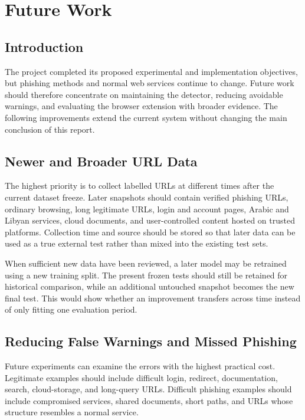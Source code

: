 \chapter{Future Work}
\label{chap:future-work}

\section{Introduction}

The project completed its proposed experimental and implementation objectives,
but phishing methods and normal web services continue to change. Future work
should therefore concentrate on maintaining the detector, reducing avoidable
warnings, and evaluating the browser extension with broader evidence. The
following improvements extend the current system without changing the main
conclusion of this report.

\section{Newer and Broader URL Data}

The highest priority is to collect labelled URLs at different times after the
current dataset freeze. Later snapshots should contain verified phishing URLs,
ordinary browsing, long legitimate URLs, login and account pages, Arabic and
Libyan services, cloud documents, and user-controlled content hosted on trusted
platforms. Collection time and source should be stored so that later data can
be used as a true external test rather than mixed into the existing test sets.

When sufficient new data have been reviewed, a later model may be retrained
using a new training split. The present frozen tests should still be retained
for historical comparison, while an additional untouched snapshot becomes the
new final test. This would show whether an improvement transfers across time
instead of only fitting one evaluation period.

\section{Reducing False Warnings and Missed Phishing}

Future experiments can examine the errors with the highest practical cost.
Legitimate examples should include difficult login, redirect, documentation,
search, cloud-storage, and long-query URLs. Difficult phishing examples should
include compromised services, shared documents, short paths, and URLs whose
structure resembles a normal service.

